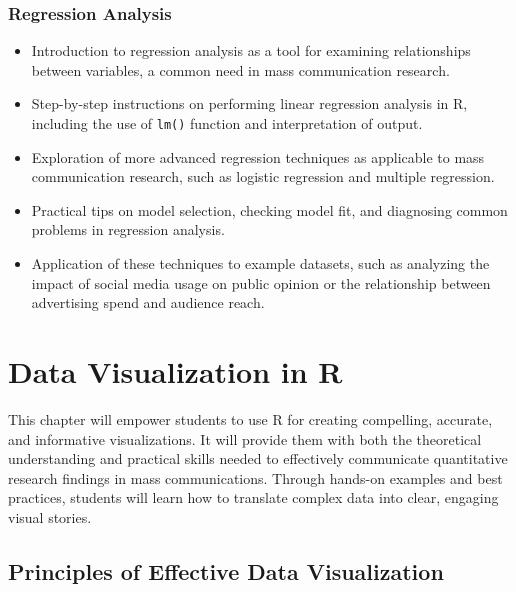 \documentclass[
]{book}
\begin{document}
\hypertarget{regression-analysis}{%
\subsection*{Regression Analysis}\label{regression-analysis}}

\begin{itemize}
\item
  Introduction to regression analysis as a tool for examining relationships between variables, a common need in mass communication research.
\item
  Step-by-step instructions on performing linear regression analysis in R, including the use of \texttt{lm()} function and interpretation of output.
\item
  Exploration of more advanced regression techniques as applicable to mass communication research, such as logistic regression and multiple regression.
\item
  Practical tips on model selection, checking model fit, and diagnosing common problems in regression analysis.
\item
  Application of these techniques to example datasets, such as analyzing the impact of social media usage on public opinion or the relationship between advertising spend and audience reach.
\end{itemize}

\hypertarget{data-visualization-in-r}{%
\chapter{Data Visualization in R}\label{data-visualization-in-r}}

This chapter will empower students to use R for creating compelling, accurate, and informative visualizations. It will provide them with both the theoretical understanding and practical skills needed to effectively communicate quantitative research findings in mass communications. Through hands-on examples and best practices, students will learn how to translate complex data into clear, engaging visual stories.

\hypertarget{principles-of-effective-data-visualization}{%
\section*{Principles of Effective Data Visualization}\label{principles-of-effective-data-visualization}}
\end{document}
